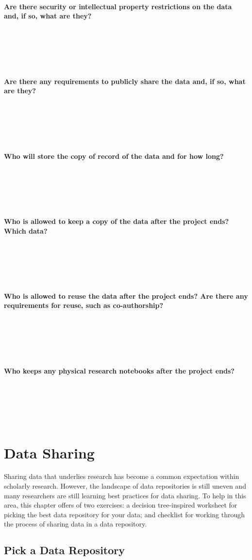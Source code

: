 \documentclass[
]{book}
\begin{document}
~

\textbf{Are there security or intellectual property restrictions on the data and, if so, what are they?}

~

~

~

\textbf{Are there any requirements to publicly share the data and, if so, what are they?}

~

~

~

\textbf{Who will store the copy of record of the data and for how long?}

~

~

~

\textbf{Who is allowed to keep a copy of the data after the project ends? Which data?}

~

~

~

\textbf{Who is allowed to reuse the data after the project ends? Are there any requirements for reuse, such as co-authorship?}

~

~

~

\textbf{Who keeps any physical research notebooks after the project ends?}

~

~

~

\hypertarget{data-sharing}{%
\chapter{Data Sharing}\label{data-sharing}}

Sharing data that underlies research has become a common expectation within scholarly research. However, the landscape of data repositories is still uneven and many researchers are still learning best practices for data sharing. To help in this area, this chapter offers of two exercises: a decision tree-inspired worksheet for picking the best data repository for your data; and checklist for working through the process of sharing data in a data repository.

\hypertarget{data-repository}{%
\section{Pick a Data Repository}\label{data-repository}}
\end{document}
